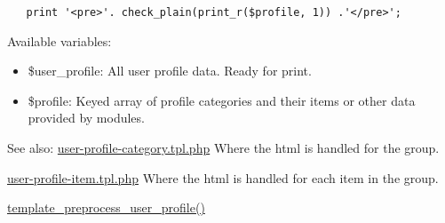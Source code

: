 \begin{Code}\begin{verbatim}   print '<pre>'. check_plain(print_r($profile, 1)) .'</pre>';
\end{verbatim}
\end{Code}



Available variables:\begin{itemize}
\item \$user\_\-profile: All user profile data. Ready for print.\item \$profile: Keyed array of profile categories and their items or other data provided by modules.\end{itemize}


\begin{Desc}
\item[See also:]\hyperlink{user-profile-category_8tpl_8php}{user-profile-category.tpl.php} Where the html is handled for the group. 

\hyperlink{user-profile-item_8tpl_8php}{user-profile-item.tpl.php} Where the html is handled for each item in the group. 

\hyperlink{user_8pages_8inc_5a1229a0cb26128b7efab80c025e2d75}{template\_\-preprocess\_\-user\_\-profile()} \end{Desc}
